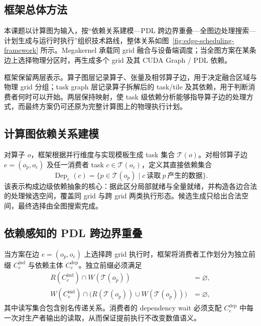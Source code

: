 \subsection{框架总体方法}

本课题以计算图为输入，按“依赖关系建模—PDL 跨边界重叠—全图边处理搜索—计划生成与运行时执行”组织技术路线，整体关系如图~\ref{fig:edge-scheduling-framework} 所示。Megakernel 承载同 grid 融合与设备端调度；当全图方案在某条边上选择物理分区时，再生成多个 grid 及其 CUDA Graph / PDL 依赖。



框架保留两层表示。算子图层记录算子、张量及相邻算子边，用于决定融合区域与物理 grid 分组；task graph 层记录算子拆解后的 task/tile 及其依赖，用于判断消费者何时可以开始。两层保持映射，使 task 级依赖分析能够指导算子边的处理方式，而最终方案仍可还原为完整计算图上的物理执行计划。

\subsection{计算图依赖关系建模}

对算子 $o$，框架根据并行维度与实现模板生成 task 集合 $\mathcal{T}(o)$。对相邻算子边 $e=(o_p,o_c)$ 及任一消费者 task $c\in\mathcal{T}(o_c)$，定义其直接依赖集合
\[
  \operatorname{Dep}_e(c)
  =\{p\in\mathcal{T}(o_p)\mid c\ \text{读取}\ p\ \text{产生的数据}\}.
\]
该表示构成边级依赖抽象的核心：据此区分局部就绪与全量就绪，并构造各边合法的处理候选空间，覆盖同 grid 与跨 grid 两类执行形态。候选生成只给出合法空间，最终选择由全图搜索完成。

\subsection{依赖感知的 PDL 跨边界重叠}

当方案在边 $e=(o_p,o_c)$ 上选择跨 grid 执行时，框架将消费者工作划分为独立前缀 $C_e^{\mathrm{ind}}$ 与依赖主体 $C_e^{\mathrm{dep}}$。独立前缀必须满足
\begin{equation}
\begin{aligned}
  R(C_e^{\mathrm{ind}})\cap W(\mathcal{T}(o_p))&=\varnothing,\\
  W(C_e^{\mathrm{ind}})\cap
  \bigl(R(\mathcal{T}(o_p))\cup W(\mathcal{T}(o_p))\bigr)&=\varnothing,
\end{aligned}
  \label{eq:pdl-legality}
\end{equation}
其中读写集合包含别名传递关系。消费者的 dependency wait 必须支配 $C_e^{\mathrm{dep}}$ 中每一次对生产者输出的读取，从而保证提前执行不改变数值语义。

